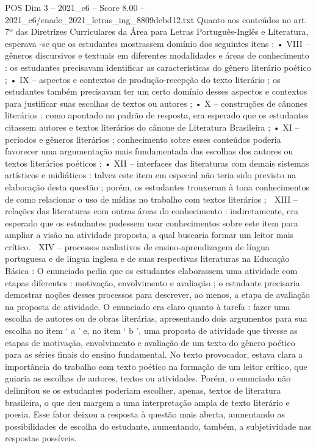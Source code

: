 \begin{textsample}{POS Dim 3 – 2021\_c6 – Score 8.00 – 2021\_c6/enade\_2021\_letras\_ing\_8809dcbd12.txt}
Quanto aos conteúdos no art. 7º das Diretrizes Curriculares da Área para Letras Português-Inglês e Literatura, esperava -se que os estudantes mostrassem domínio dos seguintes itens : • VIII – gêneros discursivos e textuais em diferentes modalidades e áreas de conhecimento : os estudantes precisavam identificar as características do gênero literário poético ; • IX – aspectos e contextos de produção-recepção do texto literário ; os estudantes também precisavam ter um certo domínio desses aspectos e contextos para justificar suas escolhas de textos ou autores ; • X – construções de cânones literários : como apontado no padrão de resposta, era esperado que os estudantes citassem autores e textos literários do cânone de Literatura Brasileira ; • XI – períodos e gêneros literários ; conhecimento sobre esses conteúdos poderia favorecer uma argumentação mais fundamentada das escolhas dos autores ou textos literários poéticos ; • XII – interfaces das literaturas com demais sistemas artísticos e midiáticos : talvez este item em especial não teria sido previsto na elaboração desta questão ; porém, os estudantes trouxeram à tona conhecimentos de como relacionar o uso de mídias no trabalho com textos literários ;  XIII – relações das literaturas com outras áreas do conhecimento : indiretamente, era esperado que os estudantes pudessem usar conhecimentos sobre este item para ampliar a visão na atividade proposta, a qual buscaria formar um leitor mais crítico.  XIV – processos avaliativos de ensino-aprendizagem de língua portuguesa e de língua inglesa e de suas respectivas literaturas na Educação Básica : O enunciado pedia que os estudantes elaborassem uma atividade com etapas diferentes : motivação, envolvimento e avaliação ; o estudante precisaria demostrar noções desses processos para descrever, ao menos, a etapa de avaliação na proposta de atividade.
O enunciado era claro quanto à tarefa : fazer uma escolha de autores ou de obras literárias, apresentando dois argumentos para sua escolha no item ‘ a ’ e, no item ‘ b ’, uma proposta de atividade que tivesse as etapas de motivação, envolvimento e avaliação de um texto do gênero poético para as séries finais do ensino fundamental.
No texto provocador, estava clara a importância do trabalho com texto poético na formação de um leitor crítico, que guiaria as escolhas de autores, textos ou atividades.
Porém, o enunciado não delimitou se os estudantes poderiam escolher, apenas, textos de literatura brasileira, o que deu margem a uma interpretação ampla de texto literário e poesia.
Esse fator deixou a resposta à questão mais aberta, aumentando as possibilidades de escolha do estudante, aumentando, também, a subjetividade nas respostas possíveis.

\end{textsample}
